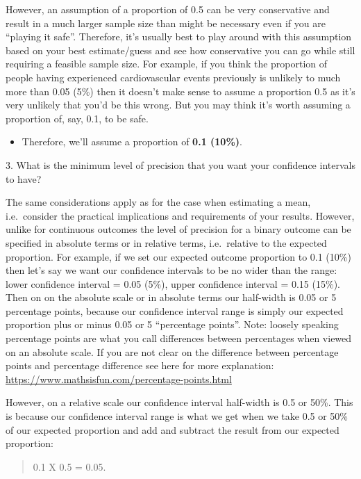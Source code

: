 \documentclass[
]{book}
\providecommand{\tightlist}{%
  \setlength{\itemsep}{0pt}\setlength{\parskip}{0pt}}
\begin{document}
However, an assumption of a proportion of 0.5 can be very conservative and result in a much larger sample size than might be necessary even if you are ``playing it safe''. Therefore, it's usually best to play around with this assumption based on your best estimate/guess and see how conservative you can go while still requiring a feasible sample size. For example, if you think the proportion of people having experienced cardiovascular events previously is unlikely to much more than 0.05 (5\%) then it doesn't make sense to assume a proportion 0.5 as it's very unlikely that you'd be this wrong. But you may think it's worth assuming a proportion of, say, 0.1, to be safe.

\begin{itemize}
\tightlist
\item
  Therefore, we'll assume a proportion of \textbf{0.1 (10\%)}.
\end{itemize}

3. What is the minimum level of precision that you want your confidence intervals to have?

The same considerations apply as for the case when estimating a mean, i.e.~consider the practical implications and requirements of your results. However, unlike for continuous outcomes the level of precision for a binary outcome can be specified in absolute terms or in relative terms, i.e.~relative to the expected proportion. For example, if we set our expected outcome proportion to 0.1 (10\%) then let's say we want our confidence intervals to be no wider than the range: lower confidence interval = 0.05 (5\%), upper confidence interval = 0.15 (15\%). Then on on the absolute scale or in absolute terms our half-width is 0.05 or 5 percentage points, because our confidence interval range is simply our expected proportion plus or minus 0.05 or 5 ``percentage points''. Note: loosely speaking percentage points are what you call differences between percentages when viewed on an absolute scale. If you are not clear on the difference between percentage points and percentage difference see here for more explanation: \url{https://www.mathsisfun.com/percentage-points.html}

However, on a relative scale our confidence interval half-width is 0.5 or 50\%. This is because our confidence interval range is what we get when we take 0.5 or 50\% of our expected proportion and add and subtract the result from our expected proportion:

\begin{quote}
0.1 X 0.5 = 0.05.
\end{quote}
\end{document}
